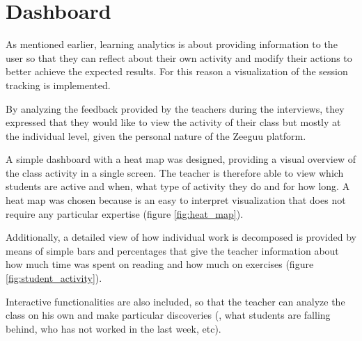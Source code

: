 \chapter{Dashboard}\label{p02:dashboard}

As mentioned earlier, learning analytics is about providing information to the user so that they can reflect about their own activity and modify their actions to better achieve the expected results. For this reason a visualization of the session tracking is implemented.

By analyzing the feedback provided by the teachers during the interviews, they expressed that they would like to view the activity of their class but mostly at the individual level, given the personal nature of the Zeeguu platform.

A simple dashboard with a heat map was designed, providing a visual overview of the class activity in a single screen. The teacher is therefore able to view which students are active and when, what type of activity they do and for how long. A heat map was chosen because is an easy to interpret visualization that does not require any particular expertise (figure \ref{fig:heat_map}).


Additionally, a detailed view of how individual work is decomposed is provided by means of simple bars and percentages that give the teacher information about how much time was spent on reading and how much on exercises (figure \ref{fig:student_activity}).


Interactive functionalities are also included, so that the teacher can analyze the class on his own and make particular discoveries (\eg, what students are falling behind, who has not worked in the last week, etc).



